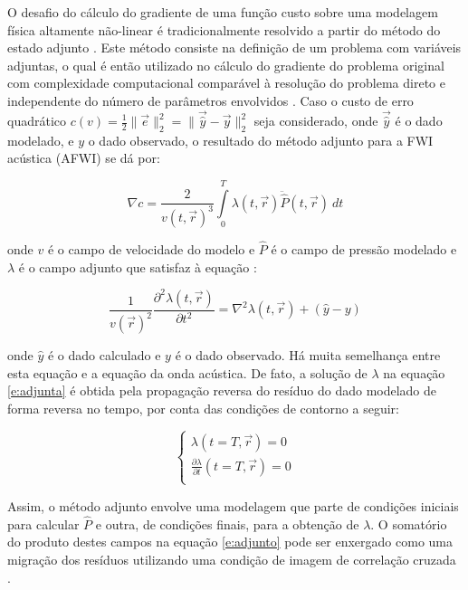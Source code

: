     O desafio do cálculo do gradiente de uma função custo sobre uma modelagem física altamente não-linear é tradicionalmente resolvido a partir do método do estado adjunto . Este método consiste na definição de um problema com variáveis adjuntas, o qual é então utilizado no cálculo do gradiente do problema original com complexidade computacional comparável à resolução do problema direto e independente do número de parâmetros envolvidos . Caso o custo de erro quadrático $c(v)=\frac{1}{2}\|\vec{e}\|_2^2=\|\vec{\hat{y}}-\vec{y} \|_2^2$ seja considerado, onde $\vec{\hat{y}}$ é o dado modelado, e $y$ o dado observado, o resultado do método adjunto para a FWI acústica (AFWI) se dá por:

    \begin{equation} \label{e:adjunto}
      \nabla c = \frac{2}{v(t,\vec{r})^3} \int \limits_0^{T} \lambda(t,\vec{r}) \ddot{\hat{P}}(t,\vec{r})\ dt
    \end{equation}

    \noindent onde $v$ é o campo de velocidade do modelo e $\hat{P}$ é o campo de pressão modelado e $\lambda$ é o campo adjunto que satisfaz à equação :

    \begin{equation} \label{e:adjunta}
      \frac{1}{v(\vec{r})^2} \frac{\partial^2 \lambda(t,\vec{r})}{\partial t^2} =
      \nabla^2 \lambda(t,\vec{r}) + (\hat{y} - y)
    \end{equation}

    \noindent onde $\hat{y}$ é o dado calculado e $y$ é o dado observado. Há muita semelhança entre esta equação e a equação da onda acústica. De fato, a solução de $\lambda$ na equação \ref{e:adjunta} é obtida pela propagação reversa do resíduo do dado modelado de forma reversa no tempo, por conta das condições de contorno a seguir:

    \begin{equation} \label{e:adjunta_condicoes}
      \begin{cases}
        \lambda(t=T,\vec{r}) = 0\\
        \frac{\partial \lambda}{\partial t}(t=T,\vec{r}) = 0\\
      \end{cases}
    \end{equation}

    Assim, o método adjunto envolve uma modelagem que parte de condições iniciais para calcular $\hat{P}$ e outra, de condições finais, para a obtenção de $\lambda$. O somatório do produto destes campos na equação \ref{e:adjunto} pode ser enxergado como uma migração dos resíduos utilizando uma condição de imagem de correlação cruzada .


